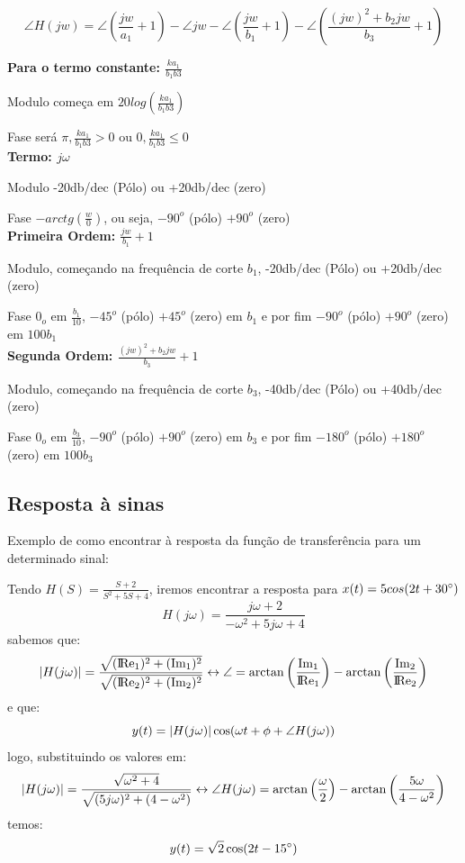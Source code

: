 \documentclass[a4paper, 12pt]{article}
\begin{document}
		\[
		\angle H(jw) = \angle (\frac{jw}{a_{1}}+1) - \angle jw - \angle (\frac{jw}{b_{1}}+1) - \angle (\frac{(jw)^{2} + b_{2}jw}{b_{3}}+1)
		\]

		\textbf{Para o termo constante: $\frac{ka_{1}}{b_{1}b{3}}$}

		Modulo começa em $20log(\frac{ka_{1}}{b_{1}b{3}})$

		Fase será $\pi, \frac{ka_{1}}{b_{1}b{3}} > 0$ ou $0, \frac{ka_{1}}{b_{1}b{3}} \leq 0$\\

		\textbf{Termo: $j\omega$}

		Modulo -20db/dec (Pólo) ou +20db/dec (zero)

		Fase $-arctg(\frac{w}{0})$, ou seja, $-90^{o}$ (pólo) $+90^{o}$ (zero)\\

		\textbf{Primeira Ordem: $\frac{jw}{b_{1}}+1$}

		Modulo, começando na frequência de corte $b_{1}$, -20db/dec (Pólo) ou +20db/dec (zero)

		Fase $0_{o}$ em $\frac{b_{1}}{10}$, $-45^{o}$ (pólo) $+45^{o}$ (zero) em $b_{1}$ e por fim $-90^{o}$ (pólo) $+90^{o}$ (zero) em $100b_{1}$\\

		\textbf{Segunda Ordem: $\frac{(jw)^{2} + b_{2}jw}{b_{3}}+1$}

		Modulo, começando na frequência de corte $b_{3}$, -40db/dec (Pólo) ou +40db/dec (zero)

		Fase $0_{o}$ em $\frac{b_{3}}{10}$, $-90^{o}$ (pólo) $+90^{o}$ (zero) em $b_{3}$ e por fim $-180^{o}$ (pólo) $+180^{o}$ (zero) em $100b_{3}$\\
		\subsection{Resposta à sinas}
		Exemplo de como encontrar à resposta da função de transferência para um determinado sinal:
		
		Tendo $H(S) = \frac{S+2}{S^{2} + 5S + 4}$, iremos encontrar a resposta para $x(t) = 5cos(2t + 30\degree)$
		\[
		H(j\omega) = \frac{j\omega + 2}{-\omega^{2} + 5j\omega + 4}
		\]
		sabemos que:
		\[
		\arrowvert H(j\omega) \arrowvert = \frac{\sqrt{(\rm I\!Re_{1})^{2} + (\rm Im_{1})^{2}}}{\sqrt{(\rm I\!Re_{2})^{2} + (\rm Im_{2})^{2}}} \leftrightarrow \angle = \arctan\left(\frac{\rm Im_{1}}{\rm I\!Re_{1}}\right) - \arctan\left(\frac{\rm Im_{2}}{\rm I\!Re_{2}}\right)
		\]
		e que:
		\[
		y(t) = \arrowvert H(j\omega) \arrowvert \cos(\omega t + \phi + \angle H(j\omega))
		\]
		logo, substituindo os valores em:
		\[
		\arrowvert H(j\omega) \arrowvert = \frac{\sqrt{\omega^{2} + 4}}{\sqrt{(5j\omega)^{2} + (4 - \omega^{2})}} \leftrightarrow \angle H(j\omega) = \arctan\left(\frac{\omega}{2}\right) - \arctan\left(\frac{5\omega}{4 - \omega^{2}}\right)
		\]
		temos:
		\[
		y(t) = \sqrt{2}\cos(2t - 15\degree)
		\]		
\end{document}
